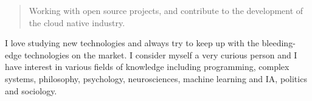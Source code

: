 \begin{quote}
Working with open source projects, and contribute to the development of the cloud native industry.
\end{quote}











I love studying new technologies and always try to keep up with the bleeding-edge technologies on the market. I consider myself a very curious person and I have interest in various fields of knowledge including programming, complex systems, philosophy, psychology, neurosciences, machine learning and IA, politics and sociology.
